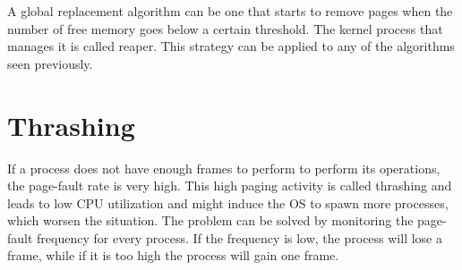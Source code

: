 A global replacement algorithm can be one that starts to remove pages when the number of free memory goes below a certain threshold. The kernel process that manages it is called reaper. This strategy can be applied to any of the algorithms seen previously.

\section{Thrashing}
If a process does not have enough frames to perform to perform its operations, the page-fault rate is very high. This high paging activity is called thrashing and leads to low CPU utilization and might induce the OS to spawn more processes, which worsen the situation. The problem can be solved by monitoring the page-fault frequency for every process. If the frequency is low, the process will lose a frame, while if it is too high the process will gain one frame.
